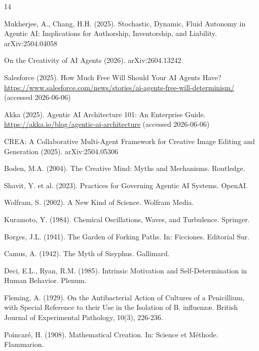 \documentclass[12pt,a4paper]{ctexart}
\begin{document}
\begin{thebibliography}{14}

Mukherjee, A., Chang, H.H. (2025). Stochastic, Dynamic, Fluid Autonomy in Agentic AI: Implications for Authorship, Inventorship, and Liability. arXiv:2504.04058

On the Creativity of AI Agents (2026). arXiv:2604.13242

Salesforce (2025). How Much Free Will Should Your AI Agents Have? \url{https://www.salesforce.com/news/stories/ai-agents-free-will-determinism/} (accessed 2026-06-06)

Akka (2025). Agentic AI Architecture 101: An Enterprise Guide. \url{https://akka.io/blog/agentic-ai-architecture} (accessed 2026-06-06)

CREA: A Collaborative Multi-Agent Framework for Creative Image Editing and Generation (2025). arXiv:2504.05306

Boden, M.A. (2004). The Creative Mind: Myths and Mechanisms. Routledge.

Shavit, Y. et al. (2023). Practices for Governing Agentic AI Systems. OpenAI.

Wolfram, S. (2002). A New Kind of Science. Wolfram Media.

Kuramoto, Y. (1984). Chemical Oscillations, Waves, and Turbulence. Springer.

Borges, J.L. (1941). The Garden of Forking Paths. In: Ficciones. Editorial Sur.

Camus, A. (1942). The Myth of Sisyphus. Gallimard.

Deci, E.L., Ryan, R.M. (1985). Intrinsic Motivation and Self-Determination in Human Behavior. Plenum.

Fleming, A. (1929). On the Antibacterial Action of Cultures of a Penicillium, with Special Reference to their Use in the Isolation of B. influenzæ. British Journal of Experimental Pathology, 10(3), 226-236.

Poincaré, H. (1908). Mathematical Creation. In: Science et Méthode. Flammarion.

\end{thebibliography}
\end{document}

